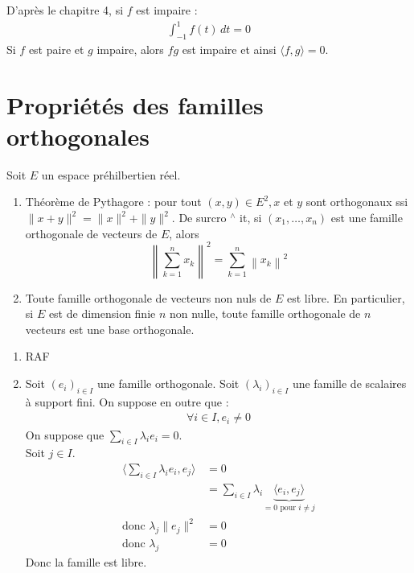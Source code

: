\documentclass[../main.tex]{subfiles}
\begin{document}
\noindent D'après le chapitre 4, si $f$ est impaire : 
\begin{align*}
    \int_{-1}^{1} f(t) \,dt = 0
\end{align*}
Si $f$ est paire et $g$ impaire, alors $fg$ est impaire et ainsi $\langle f, g \rangle = 0$. 

\section{Propriétés des familles orthogonales}
\begin{tcolorbox}[title=Théorème 34.25, title filled=false, colframe=orange, colback=orange!10!white]
    Soit $E$ un espace préhilbertien réel.
    \begin{enumerate}
        \item Théorème de Pythagore : pour tout $(x, y) \in E^2, x$ et $y$ sont orthogonaux ssi $\|x+y\|^2=\|x\|^2+\|y\|^2$. De surcro ${ }^{\wedge}$ it, si $\left(x_1, \ldots, x_n\right)$ est une famille orthogonale de vecteurs de $E$, alors
        $$\left\|\sum_{k=1}^n x_k\right\|^2=\sum_{k=1}^n\left\|x_k\right\|^2$$
        \item Toute famille orthogonale de vecteurs non nuls de $E$ est libre. En particulier, si $E$ est de dimension finie $n$ non nulle, toute famille orthogonale de $n$ vecteurs est une base orthogonale.
    \end{enumerate}
\end{tcolorbox}

\begin{enumerate}
    \item RAF
    \item Soit $(e_i)_{i\in I}$ une famille orthogonale. Soit $(\lambda_i)_{i\in I}$ une famille de scalaires à support fini. On suppose en outre que : 
    \begin{align*}
        \forall i\in I, e_i\neq 0
    \end{align*}
    On suppose que $\sum\limits_{i\in I} \lambda_i e_i = 0$. \\
    Soit $j\in I$. 
    \begin{align*}
        \langle \sum_{i\in I} \lambda_i e_i, e_j \rangle &= 0 \\
        &= \sum_{i\in I} \lambda_i \underbrace{\langle e_i, e_j \rangle}_{= 0 \text{ pour } i\neq j} \\
        \text{donc } \lambda_j \| e_j \|^2 &= 0 \\
        \text{donc } \lambda_j &= 0
    \end{align*}
    Donc la famille est libre. 
\end{enumerate}
\end{document}
